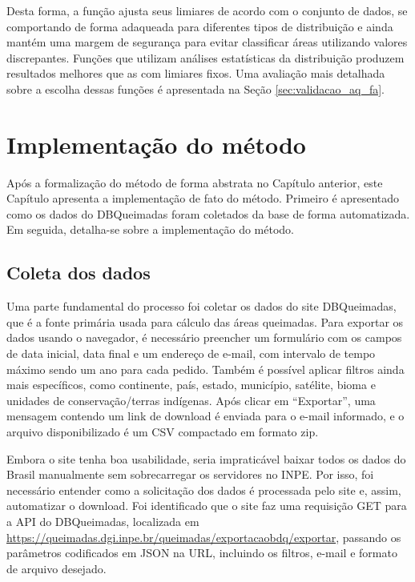 \documentclass[cic,tc]{iiufrgs}
\begin{document}
Desta forma, a função ajusta seus limiares de acordo com o conjunto de dados, se comportando de forma adaqueada para diferentes tipos de distribuição e ainda mantém uma margem de segurança para evitar classificar áreas utilizando valores discrepantes. Funções que utilizam análises estatísticas da distribuição produzem resultados melhores que as com limiares fixos. Uma avaliação mais detalhada sobre a escolha dessas funções é apresentada na Seção \ref{sec:validacao_aq_fa}.

\chapter{Implementação do método}
\label{chp:implementacao_metodo}

Após a formalização do método de forma abstrata no Capítulo anterior, este Capítulo apresenta a implementação de fato do método. Primeiro é apresentado como os dados do DBQueimadas foram coletados da base de forma automatizada. Em seguida, detalha-se sobre a implementação do método.

\section{Coleta dos dados}

Uma parte fundamental do processo foi coletar os dados do site DBQueimadas, que é a fonte primária usada para cálculo das áreas queimadas. Para exportar os dados usando o navegador, é necessário preencher um formulário com os campos de data inicial, data final e um endereço de e-mail, com intervalo de tempo máximo sendo um ano para cada pedido. Também é possível aplicar filtros ainda mais específicos, como continente, país, estado, município, satélite, bioma e unidades de conservação/terras indígenas. Após clicar em ``Exportar'', uma mensagem contendo um link de download é enviada para o e-mail informado, e o arquivo disponibilizado é um CSV compactado em formato zip.

Embora o site tenha boa usabilidade, seria impraticável baixar todos os dados do Brasil manualmente sem sobrecarregar os servidores no INPE. Por isso, foi necessário entender como a solicitação dos dados é processada pelo site e, assim, automatizar o download. Foi identificado que o site faz uma requisição GET para a API do DBQueimadas, localizada em \url{https://queimadas.dgi.inpe.br/queimadas/exportacaobdq/exportar}, passando os parâmetros codificados em JSON na URL, incluindo os filtros, e-mail e formato de arquivo desejado.
\end{document}
